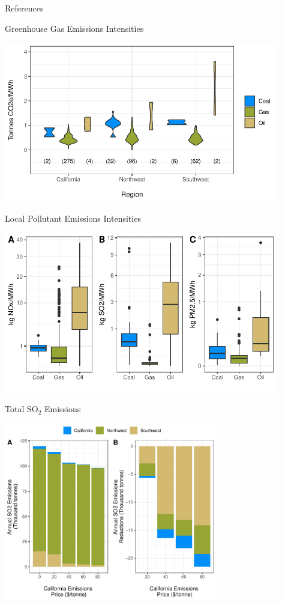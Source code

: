 \documentclass[11pt, aspectratio = 169]{beamer}
\newcommand{\1}{\mathds{1}}
\begin{document}
\begin{frame}[allowframebreaks]{References}
\footnotesize



\end{frame}


\begin{frame}{Greenhouse Gas Emissions Intensities}

\centering
\includegraphics[width = 0.9\textwidth]{figures/chapter5_figures/EI_region_violin.pdf}
    
\end{frame}

\begin{frame}{Local Pollutant Emissions Intensities}

    \centering
    \includegraphics[width = 0.9\textwidth]{figures/chapter5_figures/local_poll_EI.pdf}
        
\end{frame}

\begin{frame}{Total SO$_2$ Emissions}

    \centering
    \includegraphics[width = 0.7\textwidth]{figures/chapter5_figures/sim_so2_bca.pdf}
        
\end{frame}
\end{document}
